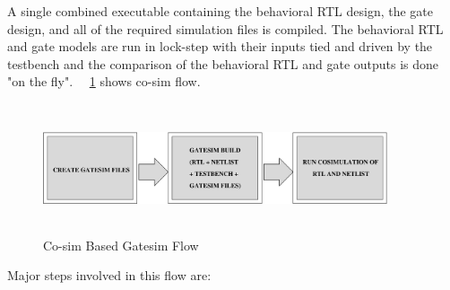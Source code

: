  A single combined executable containing the behavioral RTL design, the gate design, and all of the required simulation files is compiled. The behavioral RTL and gate models are run in lock-step with their inputs tied and driven by the testbench and the comparison of the behavioral RTL and gate outputs is done "on the fly". ~\figurename{~\ref{fig:cosim_flow.eps}} shows co-sim flow.




\begin{figure}[H]
\centering
\includegraphics[width=4in, height=1.5in]{./figures/cosim_flow.eps}
\caption{Co-sim Based Gatesim Flow}
\label{fig:cosim_flow.eps}
\end{figure}

Major steps involved in this flow are:

